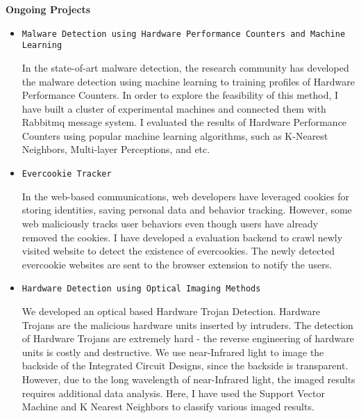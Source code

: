 \documentclass[]{article}
\begin{document}
\noindent \textbf{Ongoing Projects}
\begin{itemize}

		\item \verb+Malware Detection using Hardware Performance Counters and Machine Learning+

In the state-of-art malware detection, the research community has developed the
malware detection using machine learning to training profiles of Hardware
Performance Counters. In order to explore the feasibility of this method,  I
have built a cluster of experimental machines and connected them with Rabbitmq
message system. I evaluated the results of Hardware Performance Counters using
popular machine learning algorithms, such as K-Nearest Neighbors, Multi-layer
Perceptions, and etc.

		\item \verb+Evercookie Tracker+

In the web-based communications, web developers have leveraged cookies for
storing identities, saving personal data and behavior tracking. However, some
web maliciously tracks user behaviors even though users have already removed
the cookies. I have developed a evaluation backend to crawl newly visited
website to detect the existence of evercookies. The newly detected evercookie
websites are sent to the browser extension to notify the users.

		\item \verb+Hardware Detection using Optical Imaging Methods+

We developed an optical based Hardware Trojan Detection. Hardware Trojans are the malicious
hardware units inserted by intruders. The detection of Hardware Trojans are extremely hard -
the reverse engineering of hardware units is costly and destructive. We use near-Infrared light 
to image the backside of the Integrated Circuit Designs, since the backside is transparent. 
However, due to the long wavelength of near-Infrared light, the imaged results requires additional
data analysis. Here, I have used the Support Vector Machine and K Nearest Neighbors to classify 
various imaged results.
		
\end{itemize}
\end{document}
